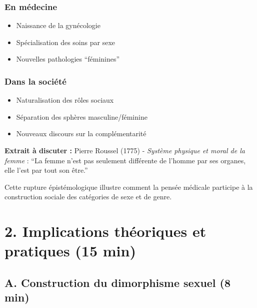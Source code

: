 \documentclass[
  letterpaper,
  DIV=11,
  numbers=noendperiod]{scrreprt}
\providecommand{\tightlist}{%
  \setlength{\itemsep}{0pt}\setlength{\parskip}{0pt}}\usepackage{longtable,booktabs,array}
\begin{document}
\subsection{En médecine}\label{en-muxe9decine}

\begin{itemize}
\tightlist
\item
  Naissance de la gynécologie
\item
  Spécialisation des soins par sexe
\item
  Nouvelles pathologies ``féminines''
\end{itemize}

\subsection{Dans la société}\label{dans-la-sociuxe9tuxe9}

\begin{itemize}
\tightlist
\item
  Naturalisation des rôles sociaux
\item
  Séparation des sphères masculine/féminine
\item
  Nouveaux discours sur la complémentarité
\end{itemize}

\textbf{Extrait à discuter :} Pierre Roussel (1775) - \emph{Système
physique et moral de la femme} : ``La femme n'est pas seulement
différente de l'homme par ses organes, elle l'est par tout son être.''

Cette rupture épistémologique illustre comment la pensée médicale
participe à la construction sociale des catégories de sexe et de genre.

\section{}\label{section-7}


\chapter{2. Implications théoriques et pratiques (15
min)}\label{implications-thuxe9oriques-et-pratiques-15-min}

\section{A. Construction du dimorphisme sexuel (8
min)}\label{a.-construction-du-dimorphisme-sexuel-8-min}
\end{document}
